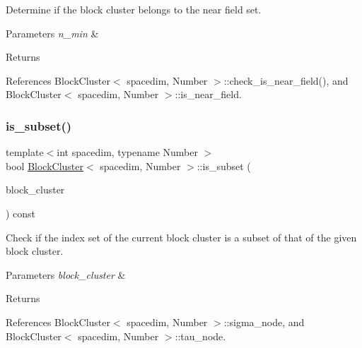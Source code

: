 Determine if the block cluster belongs to the near field set. 
\begin{DoxyParams}{Parameters}
{\em n\+\_\+min} & \\
\hline
\end{DoxyParams}
\begin{DoxyReturn}{Returns}

\end{DoxyReturn}


References Block\+Cluster$<$ spacedim, Number $>$\+::check\+\_\+is\+\_\+near\+\_\+field(), and Block\+Cluster$<$ spacedim, Number $>$\+::is\+\_\+near\+\_\+field.

\mbox{\label{classBlockCluster_af479a9471d056baa51a3f300bd0a5a27}} 
\subsubsection{\texorpdfstring{is\+\_\+subset()}{is\_subset()}}
{\footnotesize\ttfamily template$<$int spacedim, typename Number $>$ \\
bool \hyperlink{classBlockCluster}{Block\+Cluster}$<$ spacedim, Number $>$\+::is\+\_\+subset (\begin{DoxyParamCaption}\item[{const \hyperlink{classBlockCluster}{Block\+Cluster}$<$ spacedim, Number $>$ \&}]{block\+\_\+cluster }\end{DoxyParamCaption}) const}

Check if the index set of the current block cluster is a subset of that of the given block cluster. 
\begin{DoxyParams}{Parameters}
{\em block\+\_\+cluster} & \\
\hline
\end{DoxyParams}
\begin{DoxyReturn}{Returns}

\end{DoxyReturn}


References Block\+Cluster$<$ spacedim, Number $>$\+::sigma\+\_\+node, and Block\+Cluster$<$ spacedim, Number $>$\+::tau\+\_\+node.

\mbox{\label{classBlockCluster_a445fc9afc9a246f7d3832c9c96c16d21}} 
